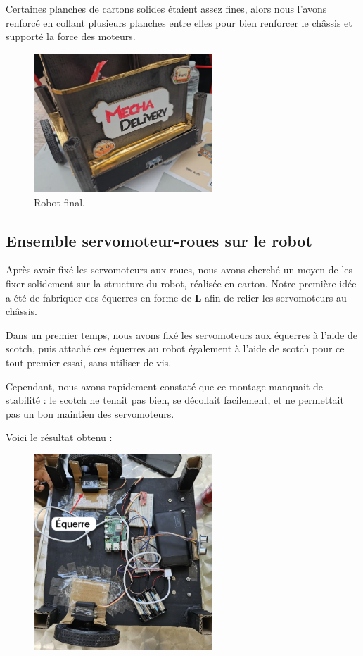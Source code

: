 \documentclass[a4paper,12pt]{report}  %
\begin{document}
Certaines planches de cartons solides étaient assez fines, alors nous l’avons renforcé en collant plusieurs planches entre elles pour bien renforcer le châssis et supporté la force des moteurs.

\begin{figure}[H]
	\centering
	\includegraphics[width=0.6\textwidth]{./attachments/robot_final_1.png}
	\caption{Robot final.}
\end{figure}


\subsection{Ensemble servomoteur-roues sur le robot}
Après avoir fixé les servomoteurs aux roues, nous avons cherché un moyen de les fixer solidement sur la structure du robot, réalisée en carton. Notre première idée a été de fabriquer des équerres en forme de \textbf{L} afin de relier les servomoteurs au châssis.

Dans un premier temps, nous avons fixé les servomoteurs aux équerres à l’aide de scotch, puis attaché ces équerres au robot également à l’aide de scotch pour ce tout premier essai, sans utiliser de vis.

Cependant, nous avons rapidement constaté que ce montage manquait de stabilité : le scotch ne tenait pas bien, se décollait facilement, et ne permettait pas un bon maintien des servomoteurs.

Voici le résultat obtenu :
\begin{figure}[H]
	\centering
	\includegraphics[width=0.6\textwidth]{./attachments/servomoteur-roues.png}
\end{figure}
\end{document}
